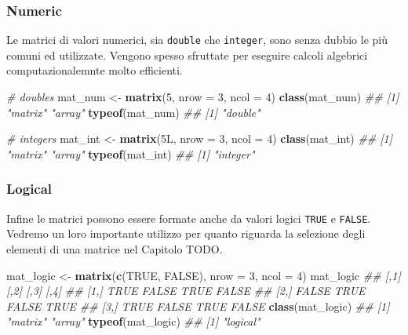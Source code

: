 \documentclass[
]{book}
\newenvironment{Shaded}{\begin{snugshade}}{\end{snugshade}}
\newcommand{\CommentTok}[1]{\textcolor[rgb]{0.56,0.35,0.01}{\textit{#1}}}
\newcommand{\DataTypeTok}[1]{\textcolor[rgb]{0.13,0.29,0.53}{#1}}
\newcommand{\DecValTok}[1]{\textcolor[rgb]{0.00,0.00,0.81}{#1}}
\newcommand{\KeywordTok}[1]{\textcolor[rgb]{0.13,0.29,0.53}{\textbf{#1}}}
\newcommand{\NormalTok}[1]{#1}
\newcommand{\OtherTok}[1]{\textcolor[rgb]{0.56,0.35,0.01}{#1}}
\newcommand{\StringTok}[1]{\textcolor[rgb]{0.31,0.60,0.02}{#1}}
\begin{document}
\hypertarget{numeric-1}{%
\subsubsection*{Numeric}\label{numeric-1}}

Le matrici di valori numerici, sia \texttt{double} che \texttt{integer}, sono senza dubbio le più comuni ed utilizzate. Vengono spesso sfruttate per eseguire calcoli algebrici computazionalemnte molto efficienti.

\begin{Shaded}
\begin{Highlighting}[]
\CommentTok{# doubles}
\NormalTok{mat_num <-}\StringTok{ }\KeywordTok{matrix}\NormalTok{(}\DecValTok{5}\NormalTok{, }\DataTypeTok{nrow =} \DecValTok{3}\NormalTok{, }\DataTypeTok{ncol =} \DecValTok{4}\NormalTok{)}
\KeywordTok{class}\NormalTok{(mat_num)}
\CommentTok{## [1] "matrix" "array"}
\KeywordTok{typeof}\NormalTok{(mat_num)}
\CommentTok{## [1] "double"}

\CommentTok{# integers}
\NormalTok{mat_int <-}\StringTok{ }\KeywordTok{matrix}\NormalTok{(5L, }\DataTypeTok{nrow =} \DecValTok{3}\NormalTok{, }\DataTypeTok{ncol =} \DecValTok{4}\NormalTok{)}
\KeywordTok{class}\NormalTok{(mat_int)}
\CommentTok{## [1] "matrix" "array"}
\KeywordTok{typeof}\NormalTok{(mat_int)}
\CommentTok{## [1] "integer"}
\end{Highlighting}
\end{Shaded}

\hypertarget{logical-1}{%
\subsubsection*{Logical}\label{logical-1}}

Infine le matrici possono essere formate anche da valori logici \texttt{TRUE} e \texttt{FALSE}. Vedremo un loro importante utilizzo per quanto riguarda la selezione degli elementi di una matrice nel Capitolo TODO.

\begin{Shaded}
\begin{Highlighting}[]
\NormalTok{mat_logic <-}\StringTok{ }\KeywordTok{matrix}\NormalTok{(}\KeywordTok{c}\NormalTok{(}\OtherTok{TRUE}\NormalTok{, }\OtherTok{FALSE}\NormalTok{), }\DataTypeTok{nrow =} \DecValTok{3}\NormalTok{, }\DataTypeTok{ncol =} \DecValTok{4}\NormalTok{)}
\NormalTok{mat_logic}
\CommentTok{##       [,1]  [,2]  [,3]  [,4]}
\CommentTok{## [1,]  TRUE FALSE  TRUE FALSE}
\CommentTok{## [2,] FALSE  TRUE FALSE  TRUE}
\CommentTok{## [3,]  TRUE FALSE  TRUE FALSE}
\KeywordTok{class}\NormalTok{(mat_logic)}
\CommentTok{## [1] "matrix" "array"}
\KeywordTok{typeof}\NormalTok{(mat_logic)}
\CommentTok{## [1] "logical"}
\end{Highlighting}
\end{Shaded}
\end{document}
